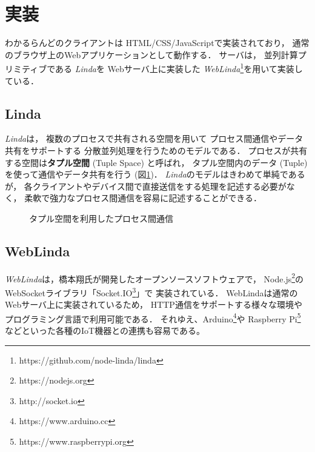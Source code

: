 \section{実装}

わかるらんどのクライアントは
HTML/CSS/JavaScriptで実装されており，
通常のブラウザ上のWebアプリケーションとして動作する．
%
サーバは，
並列計算プリミティブである
\textit{Linda}\cite{Carriero:1989:LC:63334.63337}を
Webサーバ上に実装した
\textit{WebLinda}\cite{shokai_furnitue}\footnote{https://github.com/node-linda/linda}を用いて実装している．

\subsection{Linda}

\textit{Linda}は，
複数のプロセスで共有される空間を用いて
プロセス間通信やデータ共有をサポートする
分散並列処理を行うためのモデルである．
プロセスが共有する空間は\textbf{タプル空間} (Tuple Space) と呼ばれ，
タプル空間内のデータ (Tuple) を使って通信やデータ共有を行う (図\ref{linda})．
\textit{Linda}のモデルはきわめて単純であるが，
各クライアントやデバイス間で直接送信をする処理を記述する必要がなく，
柔軟で強力なプロセス間通信を容易に記述することができる．

\begin{figure}[h]
\centering
{}
\caption{タプル空間を利用したプロセス間通信}
\label{linda}
\end{figure}

\subsection{WebLinda}

\textit{WebLinda}は，橋本翔氏が開発したオープンソースソフトウェアで，
Node.js\footnote{https://nodejs.org}の
WebSocketライブラリ「Socket.IO\footnote{http://socket.io}」で
実装されている．
WebLindaは通常のWebサーバ上に実装されているため，
HTTP通信をサポートする様々な環境やプログラミング言語で利用可能である．
それゆえ、Arduino\footnote{https://www.arduino.cc}や
Raspberry Pi\footnote{https://www.raspberrypi.org}
などといった各種のIoT機器との連携も容易である。

